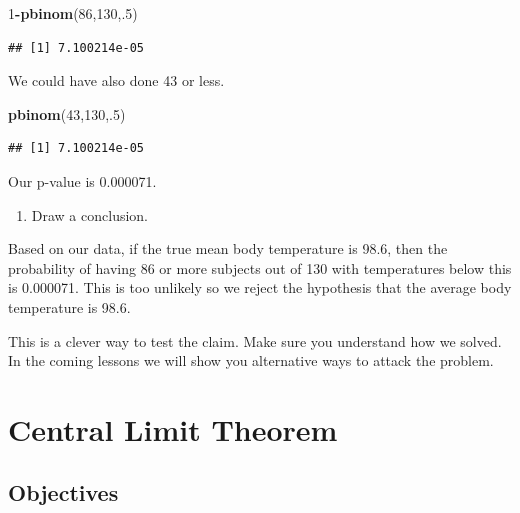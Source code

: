 \documentclass[
]{book}
\newenvironment{Shaded}{\begin{snugshade}}{\end{snugshade}}
\newcommand{\DecValTok}[1]{\textcolor[rgb]{0.00,0.00,0.81}{#1}}
\newcommand{\KeywordTok}[1]{\textcolor[rgb]{0.13,0.29,0.53}{\textbf{#1}}}
\newcommand{\NormalTok}[1]{#1}
\newcommand{\OperatorTok}[1]{\textcolor[rgb]{0.81,0.36,0.00}{\textbf{#1}}}
\providecommand{\tightlist}{%
  \setlength{\itemsep}{0pt}\setlength{\parskip}{0pt}}
\begin{document}
\begin{Shaded}
\begin{Highlighting}[]
\DecValTok{1}\OperatorTok{-}\KeywordTok{pbinom}\NormalTok{(}\DecValTok{86}\NormalTok{,}\DecValTok{130}\NormalTok{,.}\DecValTok{5}\NormalTok{)}
\end{Highlighting}
\end{Shaded}

\begin{verbatim}
## [1] 7.100214e-05
\end{verbatim}

We could have also done 43 or less.

\begin{Shaded}
\begin{Highlighting}[]
\KeywordTok{pbinom}\NormalTok{(}\DecValTok{43}\NormalTok{,}\DecValTok{130}\NormalTok{,.}\DecValTok{5}\NormalTok{)}
\end{Highlighting}
\end{Shaded}

\begin{verbatim}
## [1] 7.100214e-05
\end{verbatim}

Our p-value is 0.000071.

\begin{enumerate}
\def\labelenumi{\alph{enumi}.}
\setcounter{enumi}{5}
\tightlist
\item
  Draw a conclusion.
\end{enumerate}

Based on our data, if the true mean body temperature is 98.6, then the probability of having 86 or more subjects out of 130 with temperatures below this is 0.000071. This is too unlikely so we reject the hypothesis that the average body temperature is 98.6.

This is a clever way to test the claim. Make sure you understand how we solved. In the coming lessons we will show you alternative ways to attack the problem.

\hypertarget{CLT}{%
\chapter{Central Limit Theorem}\label{CLT}}

\newcommand{\E}{\mbox{E}}
\newcommand{\Var}{\mbox{Var}}
\newcommand{\Cov}{\mbox{Cov}}
\newcommand{\Prob}{\mbox{P}}
\newcommand{\diff}{\,\mathrm{d}}

\hypertarget{objectives-19}{%
\section{Objectives}\label{objectives-19}}
\end{document}
